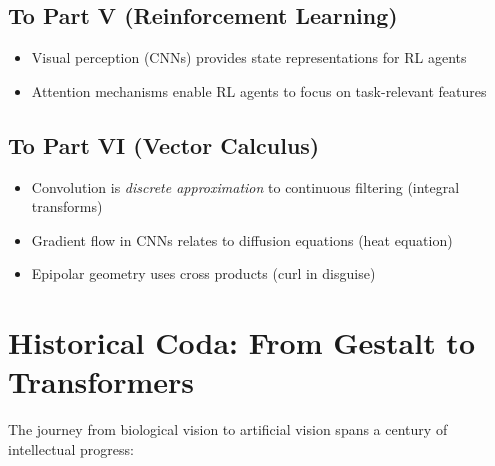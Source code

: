 \subsection{To Part V (Reinforcement Learning)}
\begin{itemize}
	\item Visual perception (CNNs) provides state representations for RL agents
	\item Attention mechanisms enable RL agents to focus on task-relevant features
\end{itemize}

\subsection{To Part VI (Vector Calculus)}
\begin{itemize}
	\item Convolution is \textit{discrete approximation} to continuous filtering (integral transforms)
	\item Gradient flow in CNNs relates to diffusion equations (heat equation)
	\item Epipolar geometry uses cross products (curl in disguise)
\end{itemize}

\section{Historical Coda: From Gestalt to Transformers}

The journey from biological vision to artificial vision spans a century of intellectual progress:


